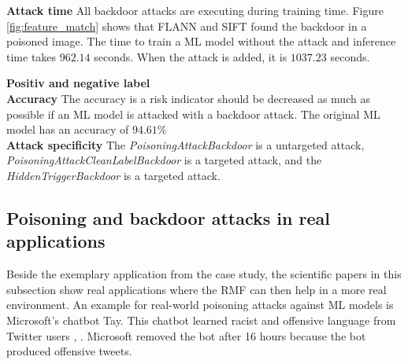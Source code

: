 \textbf{Attack time} All backdoor attacks are executing during training time. Figure \ref{fig:feature_match} shows that FLANN and SIFT found the backdoor in a poisoned image. The time to train a ML model without the attack and inference time takes $962.14$ seconds. When the attack is added, it is $1037.23$ seconds.

\textbf{Positiv and negative label} \\
\textbf{Accuracy} The accuracy is a risk indicator should be decreased as much as possible if an ML model is attacked with a backdoor attack. The original ML model has an accuracy of $94.61\%$ \\
\textbf{Attack specificity} The \textit{PoisoningAttackBackdoor} is a untargeted attack, \textit{PoisoningAttackCleanLabelBackdoor} is a targeted attack, and the \textit{HiddenTriggerBackdoor} is a targeted attack.

\subsection{Poisoning and backdoor attacks in real applications}

Beside the exemplary application from the case study, the scientific papers in this subsection show real applications where the RMF can then help in a more real environment. An example for real-world poisoning attacks against ML models is Microsoft's chatbot Tay. This chatbot learned racist and offensive language from Twitter users \cite{DBLP:conf/iciot/BaracaldoCLSZ18}, \cite{DBLP:conf/ccs/BaracaldoCLS17}. Microsoft removed the bot after 16 hours because the bot produced offensive tweets.
